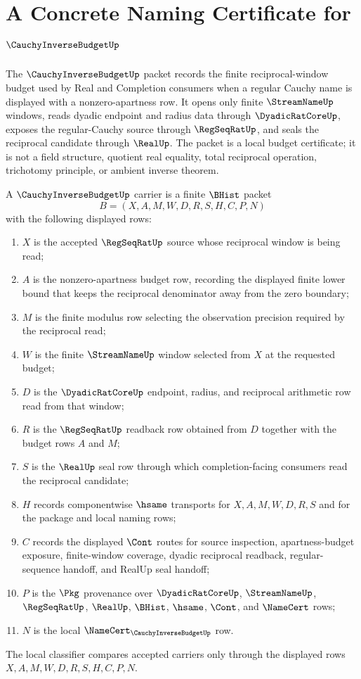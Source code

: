 \chapter{A Concrete Naming Certificate for $\CauchyInverseBudgetUp$}
\label{ch:concrete-instances-cauchyinversebudget-namecert}

The $\CauchyInverseBudgetUp$ packet records the finite reciprocal-window budget used by Real and Completion consumers when a regular Cauchy name is displayed with a nonzero-apartness row. It opens only finite $\StreamNameUp$ windows, reads dyadic endpoint and radius data through $\DyadicRatCoreUp$, exposes the regular-Cauchy source through $\RegSeqRatUp$, and seals the reciprocal candidate through $\RealUp$. The packet is a local budget certificate; it is not a field structure, quotient real equality, total reciprocal operation, trichotomy principle, or ambient inverse theorem.

\begin{definition}
\label{def:cauchy-inverse-budget-carrier}
A $\CauchyInverseBudgetUp$ carrier is a finite $\BHist$ packet
$$
B=(X,A,M,W,D,R,S,H,C,P,N)
$$
with the following displayed rows:
\begin{enumerate}
\item $X$ is the accepted $\RegSeqRatUp$ source whose reciprocal window is being read;
\item $A$ is the nonzero-apartness budget row, recording the displayed finite lower bound that keeps the reciprocal denominator away from the zero boundary;
\item $M$ is the finite modulus row selecting the observation precision required by the reciprocal read;
\item $W$ is the finite $\StreamNameUp$ window selected from $X$ at the requested budget;
\item $D$ is the $\DyadicRatCoreUp$ endpoint, radius, and reciprocal arithmetic row read from that window;
\item $R$ is the $\RegSeqRatUp$ readback row obtained from $D$ together with the budget rows $A$ and $M$;
\item $S$ is the $\RealUp$ seal row through which completion-facing consumers read the reciprocal candidate;
\item $H$ records componentwise $\hsame$ transports for $X,A,M,W,D,R,S$ and for the package and local naming rows;
\item $C$ records the displayed $\Cont$ routes for source inspection, apartness-budget exposure, finite-window coverage, dyadic reciprocal readback, regular-sequence handoff, and RealUp seal handoff;
\item $P$ is the $\Pkg$ provenance over $\DyadicRatCoreUp$, $\StreamNameUp$, $\RegSeqRatUp$, $\RealUp$, $\BHist$, $\hsame$, $\Cont$, and $\NameCert$ rows;
\item $N$ is the local $\NameCert_{\CauchyInverseBudgetUp}$ row.
\end{enumerate}
The local classifier compares accepted carriers only through the displayed rows $X,A,M,W,D,R,S,H,C,P,N$.
\end{definition}

